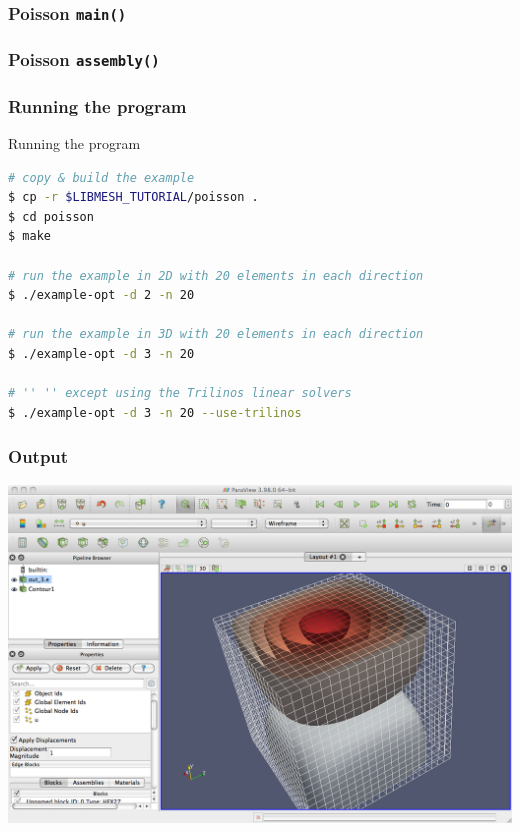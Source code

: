 \begin{frame}[allowframebreaks]
  \frametitle{Poisson \texttt{main()}}
  
\end{frame}


\begin{frame}[allowframebreaks]
  \frametitle{Poisson \texttt{assembly()}}
  
\end{frame}


\begin{frame}[fragile]
  \frametitle{Running the program}
    \begin{block}{Running the program}
    \begin{lstlisting}[language=bash]
# copy & build the example
$ cp -r $LIBMESH_TUTORIAL/poisson .
$ cd poisson
$ make

# run the example in 2D with 20 elements in each direction
$ ./example-opt -d 2 -n 20 

# run the example in 3D with 20 elements in each direction
$ ./example-opt -d 3 -n 20 

# '' '' except using the Trilinos linear solvers
$ ./example-opt -d 3 -n 20 --use-trilinos
    \end{lstlisting}
  \end{block}
\end{frame}

\frame
{
  \frametitle{Output}
  \begin{center}
    \includegraphics[height=0.8\textheight]{tutorial/poisson/screen}
  \end{center}
} 

\frame
{
  \Large
  \begin{block}{}
  \end{block}
}

